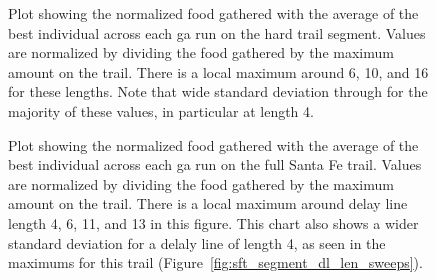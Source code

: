 \begin{figure}[hbt]
\centering
{}
\caption[Mean Food Gathered on Hard Segment with Varying Delay Line Length]{Plot showing the normalized food gathered with the average of the best individual across each \gls{ga} run on the hard trail segment. Values are normalized by dividing the food gathered by the maximum amount on the trail. There is a local maximum around 6, 10, and 16 for these lengths. Note that wide standard deviation through for the majority of these values, in particular at length 4.}
\label{fig:sft_hard_segment_mean_dl_len_sweeps}
\end{figure}

\begin{figure}[hbt]
\centering
{}
\caption[Mean Food Gathered on Santa Fe Trail with Varying Delay Line Length]{Plot showing the normalized food gathered with the average of the best individual across each \gls{ga} run on the full Santa Fe trail. Values are normalized by dividing the food gathered by the maximum amount on the trail. There is a local maximum around delay line length 4, 6, 11, and 13 in this figure. This chart also shows a wider standard deviation for a delaly line of length 4, as seen in the maximums for this trail (Figure~\ref{fig:sft_segment_dl_len_sweeps}).}
\label{fig:sft_full_segment_mean_dl_len_sweeps}
\end{figure}

